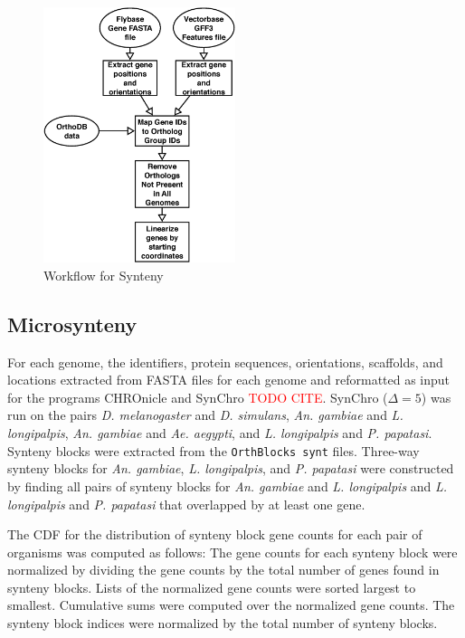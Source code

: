 \begin{figure}[H]
  \centering
  \includegraphics[width=0.5\textwidth]{figures/synteny/orthodb_dotplot_workflow}
  \caption{Workflow for Synteny}
  \label{fig:synteny-workflow}
\end{figure}

\subsection{Microsynteny} \label{sec:synteny-methods-synchro}
For each genome, the identifiers, protein sequences, orientations, scaffolds, and locations extracted from FASTA files for each genome and reformatted as input for the programs CHROnicle and SynChro \textcolor{red}{TODO CITE}.  SynChro ($\Delta=5$) was run on the pairs \emph{D. melanogaster} and \emph{D. simulans}, \emph{An. gambiae} and \emph{L. longipalpis}, \emph{An. gambiae} and \emph{Ae. aegypti}, and \emph{L. longipalpis} and \emph{P. papatasi}.  Synteny blocks were extracted from the \texttt{OrthBlocks synt} files.  Three-way synteny blocks for \emph{An. gambiae}, \emph{L. longipalpis}, and \emph{P. papatasi} were constructed by finding all pairs of synteny blocks for \emph{An. gambiae} and \emph{L. longipalpis} and \emph{L. longipalpis} and \emph{P. papatasi} that overlapped by at least one gene.  

The CDF for the distribution of synteny block gene counts for each pair of organisms was computed as follows: The gene counts for each synteny block were normalized by dividing the gene counts by the total number of genes found in synteny blocks. Lists of the normalized gene counts were sorted largest to smallest.  Cumulative sums were computed over the normalized gene counts. The synteny block indices were normalized by the total number of synteny blocks.

